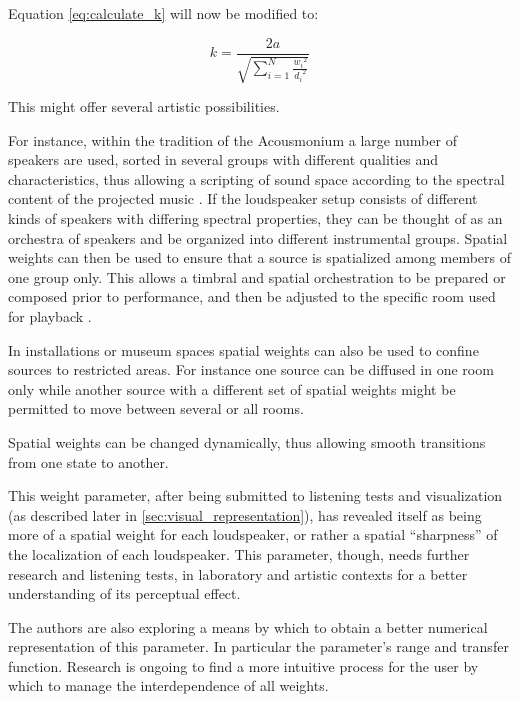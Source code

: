 \documentclass[twoside,10pt]{article}
\begin{document}
Equation \ref{eq:calculate_k} will now be modified to:

\begin{equation} \label{eq:calculate_k_weighted}
k = \frac{2a}{\sqrt{\sum_{i=1}^{N} \frac{{w_{i}}^2}{{d_{i}}^2}}}
\end{equation}

This might offer several artistic possibilities. 

For instance, within the tradition of the Acousmonium \cite{Bayle:1993MusiqueAcousmatique} a large number of speakers are used, sorted in several groups with different qualities and characteristics, thus allowing a scripting of sound space according to the spectral content of the projected music \cite{Prager:2002acousmatique}. If the loudspeaker setup consists of different kinds of speakers with differing spectral properties, they can be thought of as an orchestra of speakers and be organized into different instrumental groups. Spatial weights can then be used to ensure that a source is spatialized among members of one group only. This allows a timbral and spatial orchestration to be prepared or composed prior to performance, and then be adjusted to the specific room used for playback \cite{Lyon:2008spatial_orchestration}. 

In installations or museum spaces spatial weights can also be used to confine sources to restricted areas. For instance one source can be diffused in one room only while another source with a different set of spatial weights might be permitted to move between several or all rooms.

Spatial weights can be changed dynamically, thus allowing smooth transitions from one state to another. 

This weight parameter, after being submitted to listening tests and visualization (as described later in \ref{sec:visual_representation}), has revealed itself as being more of a spatial weight for each loudspeaker, or rather a spatial ``sharpness'' of the localization of each loudspeaker. This parameter, though, needs further research and listening tests, in laboratory and artistic contexts for a better understanding of its perceptual effect.

The authors are also exploring a means by which to obtain a better numerical representation of this parameter.  In particular the parameter's range and transfer function. Research is ongoing to find a more intuitive process for the user by which to manage the interdependence of all weights.
\end{document}
